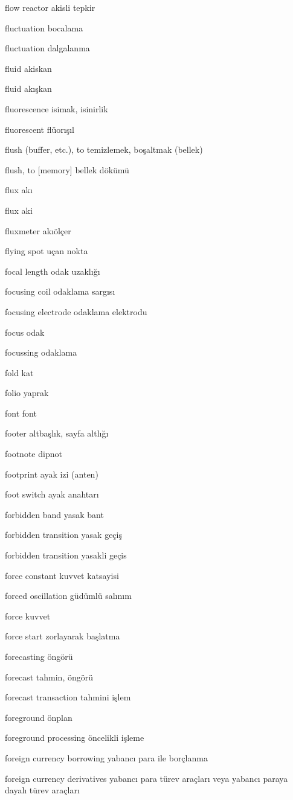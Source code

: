 \documentclass[12pt,fleqn]{article}\usepackage{../../common}
\begin{document}
flow reactor akisli tepkir

fluctuation bocalama

fluctuation dalgalanma

fluid akiskan

fluid akışkan

fluorescence isimak, isinirlik

fluorescent flüorışıl

flush (buffer, etc.), to temizlemek, boşaltmak (bellek)

flush, to [memory] bellek dökümü

flux akı

flux aki

fluxmeter akıölçer

flying spot uçan nokta

focal length odak uzaklığı

focusing coil odaklama sargısı

focusing electrode odaklama elektrodu

focus odak

focussing odaklama

fold kat

folio yaprak

font font

footer altbaşlık, sayfa altlığı

footnote dipnot

footprint ayak izi (anten)

foot switch ayak anahtarı

forbidden band yasak bant

forbidden transition yasak geçiş

forbidden transition yasakli geçis

force constant kuvvet katsayisi

forced oscillation güdümlü salınım

force kuvvet

force start zorlayarak başlatma

forecasting öngörü

forecast tahmin, öngörü

forecast transaction tahmini işlem

foreground önplan

foreground processing öncelikli işleme

foreign currency borrowing yabancı para ile borçlanma

foreign currency derivatives yabancı para türev araçları veya yabancı paraya dayalı türev araçları
\end{document}
